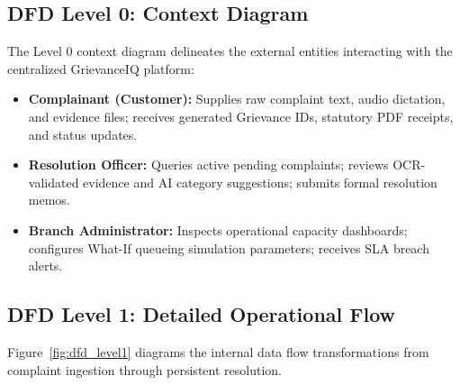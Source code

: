 \subsection{DFD Level 0: Context Diagram}
The Level 0 context diagram delineates the external entities interacting with the centralized GrievanceIQ platform:
\begin{itemize}
    \item \textbf{Complainant (Customer):} Supplies raw complaint text, audio dictation, and evidence files; receives generated Grievance IDs, statutory PDF receipts, and status updates.
    \item \textbf{Resolution Officer:} Queries active pending complaints; reviews OCR-validated evidence and AI category suggestions; submits formal resolution memos.
    \item \textbf{Branch Administrator:} Inspects operational capacity dashboards; configures What-If queueing simulation parameters; receives SLA breach alerts.
\end{itemize}

\subsection{DFD Level 1: Detailed Operational Flow}
Figure~\ref{fig:dfd_level1} diagrams the internal data flow transformations from complaint ingestion through persistent resolution.

